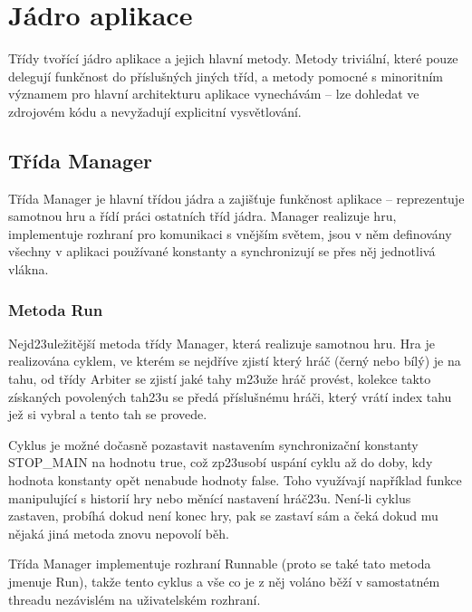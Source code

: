 \documentclass{article}
\begin{document}
\section{J\'adro aplikace}
T\v{r}\'idy tvo\v{r}\'ic\'i j\'adro aplikace a jejich hlavn\'i metody. Metody trivi\'aln\'i, kter\'e pouze deleguj\'i funk\v{c}nost do p\v{r}\'islu\v{s}n\'ych jin\'ych t\v{r}\'id, a metody pomocn\'e s minoritn\'im v\'yznamem pro hlavn\'i architekturu aplikace vynech\'av\'am – lze dohledat ve zdrojov\'em k\'odu a nevy\v{z}aduj\'i explicitn\'i vysv\v{e}tlov\'an\'i.


\subsection{T\v{r}\'ida Manager}
T\v{r}\'ida Manager je hlavn\'i t\v{r}\'idou j\'adra a zaji\v{s}\v{t}uje funk\v{c}nost aplikace – reprezentuje samotnou hru a \v{r}\'id\'i pr\'aci ostatn\'ich t\v{r}\'id j\'adra. Manager realizuje hru, implementuje rozhran\'i pro komunikaci s vn\v{e}j\v{s}\'im sv\v{e}tem, jsou v n\v{e}m definov\'any v\v{s}echny v aplikaci pou\v{z}\'ivan\'e konstanty a synchronizuj\'i se p\v{r}es n\v{e}j jednotliv\'a vl\'akna.

\subsubsection{Metoda Run}
Nejd\accent23ule\v{z}it\v{e}j\v{s}\'i metoda t\v{r}\'idy Manager, kter\'a realizuje samotnou hru. Hra je realizov\'ana cyklem, ve kter\'em se nejd\v{r}\'ive zjist\'i kter\'y hr\'a\v{c} (\v{c}ern\'y nebo b\'il\'y) je na tahu, od t\v{r}\'idy Arbiter se zjist\'i jak\'e tahy m\accent23u\v{z}e hr\'a\v{c} prov\'est, kolekce takto z\'iskan\'ych povolen\'ych tah\accent23u se p\v{r}ed\'a p\v{r}\'islu\v{s}n\'emu hr\'a\v{c}i, kter\'y vr\'at\'i index tahu je\v{z} si vybral a tento tah se provede.\medskip

Cyklus je mo\v{z}n\'e do\v{c}asn\v{e} pozastavit nastaven\'im synchroniza\v{c}n\'i konstanty STOP\_MAIN na hodnotu true, co\v{z} zp\accent23usob\'i usp\'an\'i cyklu a\v{z} do doby, kdy hodnota konstanty op\v{e}t nenabude hodnoty false. Toho vyu\v{z}\'ivaj\'i nap\v{r}\'iklad funkce manipuluj\'ic\'i s histori\'i hry nebo m\v{e}n\'ic\'i nastaven\'i hr\'a\v{c}\accent23u. Nen\'i-li cyklus zastaven, prob\'ih\'a dokud nen\'i konec hry, pak se zastav\'i s\'am a \v{c}ek\'a dokud mu n\v{e}jak\'a jin\'a metoda znovu nepovol\'i b\v{e}h.\medskip

T\v{r}\'ida Manager implementuje rozhran\'i Runnable (proto se tak\'e tato metoda jmenuje Run), tak\v{z}e tento cyklus a v\v{s}e co je z n\v{e}j vol\'ano b\v{e}\v{z}\'i v samostatn\'em threadu nez\'avisl\'em na u\v{z}ivatelsk\'em rozhran\'i.
\end{document}
